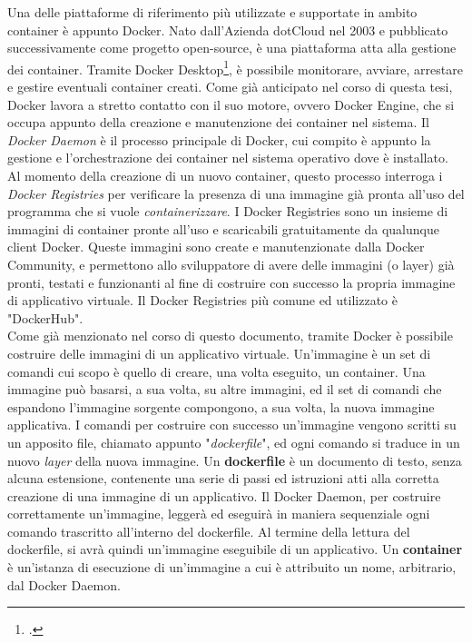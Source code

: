 Una delle piattaforme di riferimento più utilizzate e supportate in ambito container è appunto Docker. Nato dall'Azienda dotCloud nel 2003 e pubblicato successivamente come progetto open-source, è una piattaforma atta alla gestione dei container. Tramite Docker Desktop\footcite{presente solamente per le versioni Windows}, è possibile monitorare, avviare, arrestare e gestire eventuali container creati. Come già anticipato nel corso di questa tesi, Docker lavora a stretto contatto con il suo motore, ovvero Docker Engine, che si occupa appunto della creazione e manutenzione dei container nel sistema.
Il \textit{Docker Daemon} è il processo principale di Docker, cui compito è appunto la gestione e l'orchestrazione dei container nel sistema operativo dove è installato. Al momento della creazione di un nuovo container, questo processo interroga i \textit{Docker Registries} per verificare la presenza di una immagine già pronta all'uso del programma che si vuole \textit{containerizzare}. I Docker Registries sono un insieme di immagini di container pronte all'uso e scaricabili gratuitamente da qualunque client Docker. Queste immagini sono create e manutenzionate dalla Docker Community, e permettono allo sviluppatore di avere delle immagini (o layer) già pronti, testati e funzionanti al fine di costruire con successo la propria immagine di applicativo virtuale. Il Docker Registries più comune ed utilizzato è "DockerHub".\\
Come già menzionato nel corso di questo documento, tramite Docker è possibile costruire delle immagini di un applicativo virtuale. Un'immagine è un set di comandi cui scopo è quello di creare, una volta eseguito, un container. Una immagine può basarsi, a sua volta, su altre immagini, ed il set di comandi che espandono l'immagine sorgente compongono, a sua volta, la nuova immagine applicativa. I comandi per costruire con successo un'immagine vengono scritti su un apposito file, chiamato appunto "\textit{dockerfile}", ed ogni comando si traduce in un nuovo \textit{layer} della nuova immagine. Un \textbf{dockerfile} è un documento di testo, senza alcuna estensione, contenente una serie di passi ed istruzioni atti alla corretta creazione di una immagine di un applicativo. Il Docker Daemon, per costruire correttamente un'immagine, leggerà ed eseguirà in maniera sequenziale ogni comando trascritto all'interno del dockerfile. Al termine della lettura del dockerfile, si avrà quindi un'immagine eseguibile di un applicativo. Un \textbf{container} è un'istanza di esecuzione di un'immagine a cui è attribuito un nome, arbitrario, dal Docker Daemon.

